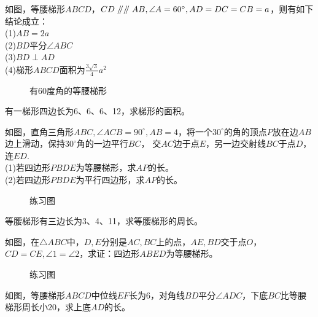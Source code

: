 \begin{definition}
    如图，等腰梯形$ABCD$，$CD\mathrel{/\mkern-5mu/} \mathrel{/\mkern-5mu/} AB,\angle A=60^\circ,AD=DC=CB=a$，则有如下结论成立：\\
    (1)$AB=2a$ \\
    (2)$BD$平分$\angle ABC$ \\
    (3)$BD\perp AD$ \\
    (4)梯形$ABCD$面积为$\frac{3\sqrt{3}}{4}a^2$
\end{definition}
\begin{figure}[H]
    \centering
    \resizebox{4cm}{!}{}
    \caption{有60度角的等腰梯形}
\end{figure}
\begin{problem}
有一梯形四边长为6、6、6、12，求梯形的面积。\\
\end{problem}
\begin{problem}
如图，直角三角形$ABC,\angle ACB=90^\circ,AB=4$，将一个$30^\circ$的角的顶点$P$放在边$AB$边上滑动，保持$30^\circ$角的一边平行$BC$，
交$AC$边于点$E$，另一边交射线$BC$于点$D$，连$ED$.  \\
(1)若四边形$PBDE$为等腰梯形，求$AP$的长。\\
(2)若四边形$PBDE$为平行四边形，求$AP$的长。\\
\end{problem}
\begin{figure}[H]
    \centering
    \resizebox{4cm}{!}{}
    \caption{练习图}
\end{figure}
\begin{problem}
等腰梯形有三边长为3、4、11，求等腰梯形的周长。\\
\end{problem}
\begin{problem}
如图，在$\triangle ABC$中，$D,E$分别是$AC,BC$上的点，$AE,BD$交于点$O$，$CD=CE,\angle 1=\angle 2$，求证：四边形$ABED$为等腰梯形。\\
\end{problem}
\begin{figure}[H]
    \centering
    \resizebox{4cm}{!}{}
    \caption{练习图}
\end{figure}
\begin{problem}
如图，等腰梯形$ABCD$中位线$EF$长为6，对角线$BD$平分$\angle ADC$，下底$BC$比等腰梯形周长小$20$，求上底$AD$的长。
\end{problem}
